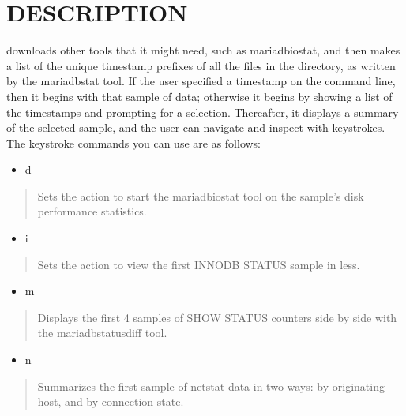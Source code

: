 \documentclass[letterpaper,10pt,english]{sphinxmanual}
\begin{document}
\section{DESCRIPTION}
\label{\detokenize{mariadb-stat-browser:description}}
 downloads other tools that it might need, such as mariadb\sphinxhyphen{}iostat,
and then makes a list of the unique timestamp prefixes of all the files in
the directory, as written by the mariadb\sphinxhyphen{}stat tool.  If the user specified
a timestamp on the command line, then it begins with that sample of data;
otherwise it begins by showing a list of the timestamps and prompting for
a selection.  Thereafter, it displays a summary of the selected sample, and
the user can navigate and inspect with keystrokes.  The keystroke commands
you can use are as follows:
\begin{itemize}
\item {} 
d

\end{itemize}
\begin{quote}

Sets the action to start the mariadb\sphinxhyphen{}iostat tool on the sample’s disk
performance statistics.
\end{quote}
\begin{itemize}
\item {} 
i

\end{itemize}
\begin{quote}

Sets the action to view the first INNODB STATUS sample in less.
\end{quote}
\begin{itemize}
\item {} 
m

\end{itemize}
\begin{quote}

Displays the first 4 samples of SHOW STATUS counters side by side with the
mariadb\sphinxhyphen{}status\sphinxhyphen{}diff tool.
\end{quote}
\begin{itemize}
\item {} 
n

\end{itemize}
\begin{quote}

Summarizes the first sample of netstat data in two ways: by originating host,
and by connection state.
\end{quote}
\end{document}
